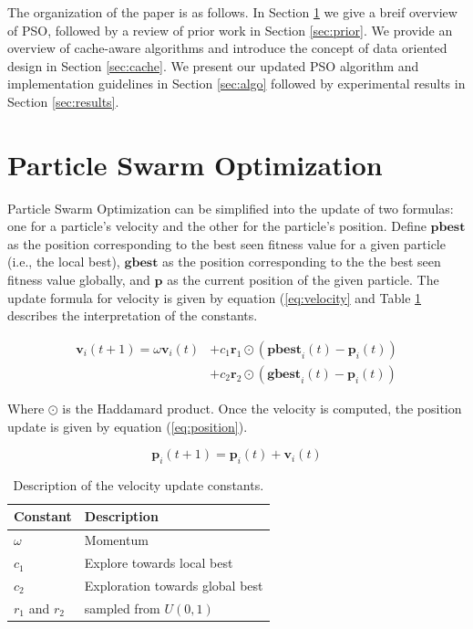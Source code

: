The organization of the paper is as follows. In Section \ref{sec:pso} we give a
breif overview of PSO, followed by a review of prior work in Section
\ref{sec:prior}.
We provide an overview of cache-aware algorithms and introduce the concept of
data oriented design in Section \ref{sec:cache}.
We present our updated PSO algorithm and implementation guidelines in Section
\ref{sec:algo} followed by experimental results in Section \ref{sec:results}.

\section{Particle Swarm Optimization}\label{sec:pso}
Particle Swarm Optimization can be simplified into the update of two formulas:
one for a particle's velocity and the other for the particle's position. Define
$\textbf{pbest}$ as the position corresponding to the best seen fitness value
for a given particle (i.e., the local best), $\textbf{gbest}$ as the position
corresponding to the the best seen fitness value globally, and $\textbf{p}$ as
the current position of the given particle. The update formula for velocity is
given by equation (\ref{eq:velocity} and Table \ref{tab:constants} describes
the interpretation of the constants.

\begin{align}
  \textbf{v}_i(t+1) = \omega \textbf{v}_i (t) & +
                                                c_1 \textbf{r}_1\odot (\textbf{pbest}_i(t) -
                                                \textbf{p}_i(t))
  \\\label{eq:velocity}
  &+ c_2 \textbf{r}_2 \odot(\textbf{gbest}_i(t) - \textbf{p}_i(t))\nonumber
\end{align}

Where $\odot$ is the Haddamard product.
Once the velocity is computed, the position update is given by equation
(\ref{eq:position}).

\begin{equation}\label{eq:position}
  \textbf{p}_i(t+1) = \textbf{p}_i(t) + \textbf{v}_i(t)
\end{equation}

\begin{table}
  \caption{Description of the velocity update constants.}\label{tab:constants}
  \begin{tabular}{ll}\toprule
  \textbf{Constant} & \textbf{Description}\\\midrule
  $\omega$ & Momentum\\
  $c_1$ & Explore towards local best\\
  $c_2$ & Exploration towards global best\\
  $r_1$ and $r_2$ & sampled from $U(0,1)$\\\bottomrule
  \end{tabular}
\end{table}

